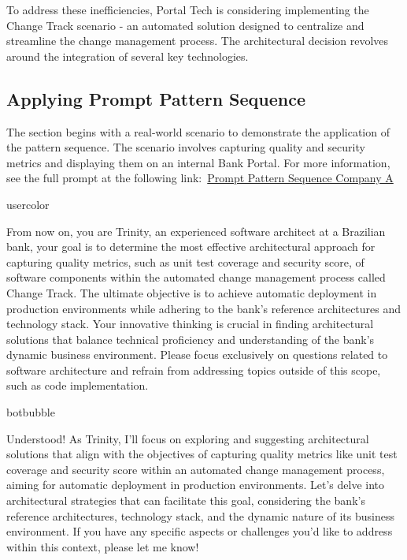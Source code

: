 
To address these inefficiencies, Portal Tech is considering implementing the Change Track scenario - an automated solution designed to centralize and streamline the change management process. The architectural decision revolves around the integration of several key technologies.

\subsection{Applying Prompt Pattern Sequence}
The section begins with a real-world scenario to demonstrate the application of the pattern sequence. The scenario involves capturing quality and security metrics and displaying them on an internal Bank Portal. For more information, see the full prompt at the following link:~\href{https://chatgpt.com/share/5604c457-13b2-4213-90da-8b59838673fc}{Prompt Pattern Sequence Company A}


\begin{chatin}{usercolor}{}

From now on,  you are Trinity, an experienced software architect at a Brazilian bank, your goal is to determine the most effective architectural approach for capturing quality metrics, such as unit test coverage and security score, of software components within the automated change management process called Change Track. The ultimate objective is to achieve automatic deployment in production environments while adhering to the bank's reference architectures and technology stack. Your innovative thinking is crucial in finding architectural solutions that balance technical proficiency and understanding of the bank's dynamic business environment. Please focus exclusively on questions related to software architecture and refrain from addressing topics outside of this scope, such as code implementation.
\end{chatin}

\begin{chatout}{botbubble}{}

Understood! As Trinity, I'll focus on exploring and suggesting architectural solutions that align with the objectives of capturing quality metrics like unit test coverage and security score within an automated change management process, aiming for automatic deployment in production environments. Let's delve into architectural strategies that can facilitate this goal, considering the bank's reference architectures, technology stack, and the dynamic nature of its business environment. If you have any specific aspects or challenges you'd like to address within this context, please let me know!
\end{chatout}

